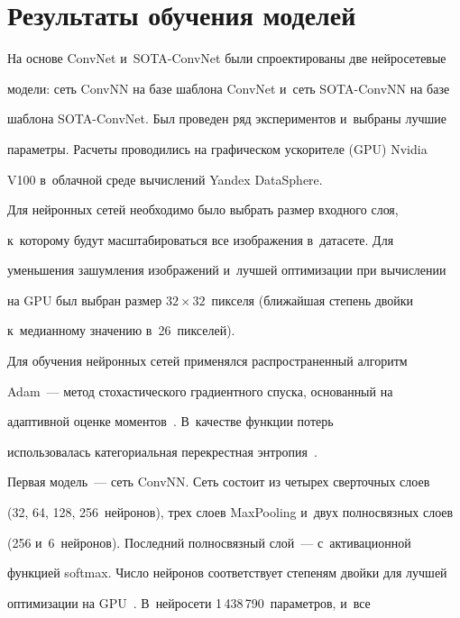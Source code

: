 \section{Результаты обучения моделей}





  На основе ConvNet и~SOTA-ConvNet были спроектированы две нейросетевые 


модели: сеть ConvNN на базе шаблона ConvNet и~сеть SOTA-ConvNN на базе 


шаб\-ло\-на SOTA-ConvNet. Был проведен ряд экспериментов и~выбраны лучшие 


па\-ра\-мет\-ры. Расчеты проводились на графическом ускорителе (GPU) Nvidia 


V100 в~облачной среде вы\-чис\-ле\-ний Yandex DataSphere. 


  


  Для нейронных сетей необходимо было выбрать размер входного слоя, 


к~которому будут масштабироваться все изображения в~датасете. Для 


уменьшения за\-шум\-ле\-ния изображений и~лучшей оптимизации при вы\-чис\-ле\-нии 


на GPU был выбран размер $32 \times 32$~пикселя (ближайшая степень двойки 


к~медианному значению в~26~пикселей).


  


  Для обучения нейронных сетей применялся распространенный алгоритм 


Adam~--- метод стохастического градиентного спус\-ка, основанный на 


адаптивной оценке моментов~\cite{17-ar}. В~качестве функции потерь 


использовалась категориальная перекрестная энтропия~\cite{13-ar}. 


  


  Первая модель~--- сеть ConvNN. Сеть состоит из четырех сверточных слоев 


(32, 64, 128, 256~нейронов), трех слоев MaxPooling и~двух полносвязных слоев 


(256 и~6~нейронов). Последний полносвязный слой~--- с~активационной 


функцией softmax. Чис\-ло нейронов соответствует степеням двойки для лучшей 


оптимизации на GPU~\cite{13-ar}. В~нейросети 1\,438\,790~параметров, и~все 


